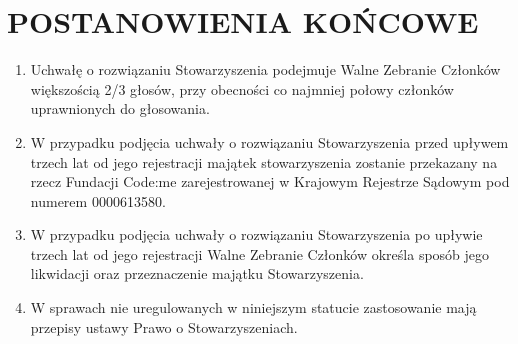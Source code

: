 \documentclass{article}
\begin{document}
\section{POSTANOWIENIA KOŃCOWE}
  \begin{enumerate}
    \item Uchwałę o rozwiązaniu Stowarzyszenia podejmuje Walne Zebranie Członków większością 2/3 głosów, przy obecności co najmniej połowy członków uprawnionych do głosowania.
    \item W przypadku podjęcia uchwały o rozwiązaniu Stowarzyszenia przed upływem trzech lat od jego rejestracji majątek stowarzyszenia zostanie przekazany na rzecz Fundacji Code:me zarejestrowanej w Krajowym Rejestrze Sądowym pod numerem 0000613580.
    \item W przypadku podjęcia uchwały o rozwiązaniu Stowarzyszenia po upływie trzech lat od jego rejestracji Walne Zebranie Członków określa sposób jego likwidacji oraz przeznaczenie majątku Stowarzyszenia.
    \item W sprawach nie uregulowanych w niniejszym statucie zastosowanie mają przepisy ustawy Prawo o Stowarzyszeniach.
  \end{enumerate}
\end{document}
